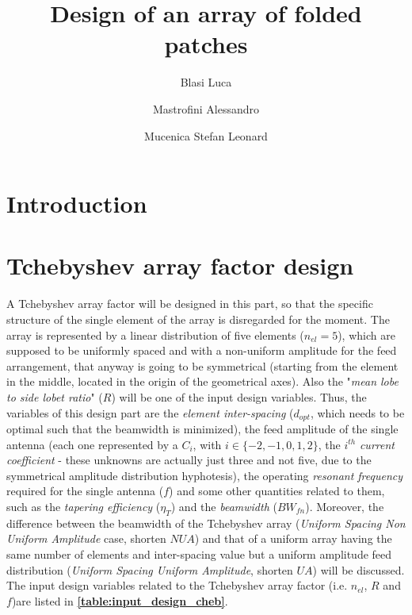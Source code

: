 \documentclass[10pt,a4paper,twocolumn]{article}
\title{\vspace*{20 pt}\fontfamily{qag}\selectfont\color{Turquoise}\huge\textbf{Design of an array of folded patches}\vspace*{10 pt}}
\author[1]{Blasi Luca}
\author[2]{Mastrofini Alessandro}
\author[3]{Mucenica Stefan Leonard}
\affil[2]{email}
\affil[3]{email}
\date{}
\begin{document}
	{\selectfont







\twocolumn[{
\begin{@twocolumnfalse} 
		\vspace*{10 pt}
	\begingroup
	\let\center\flushleft
	\maketitle

	\let\endcenter\endflushleft
	
	\endgroup
		\vspace*{5 pt}
		
		
	\begin{abstract}
	\textcolor{blue}{\lipsum[1-2]}
	\end{abstract}
	\vspace*{20 pt}
\end{@twocolumnfalse}
}
]




\section*{Introduction}
	\textcolor{blue}{\lipsum[1]}
\section*{Tchebyshev array factor design}

\indent A Tchebyshev array factor will be designed in this part, so that the specific structure of the single element of the array is disregarded for the moment. The array is represented by a linear distribution of five elements ($n_{el}=5$), which are supposed to be uniformly spaced and with a non-uniform amplitude for the feed arrangement, that anyway is going to be symmetrical (starting from the element in the middle, located in the origin of the geometrical axes). Also the "\emph{mean lobe to side lobet ratio}" ($R$) will be one of the input design variables. Thus, the variables of this design part are the \emph{element inter-spacing} ($d_{opt}$, which needs to be optimal such that the beamwidth is minimized), the feed amplitude of the single antenna (each one represented by a $C_i$, with $i\in\{-2,-1,0,1,2\}$, the $i^{th}$ \emph{current coefficient} - these unknowns are actually just three and not five, due to the symmetrical amplitude distribution hyphotesis), the operating \emph{resonant frequency} required for the single antenna ($f$) and some other quantities related to them, such as the \emph{tapering efficiency} ($\eta_T$) and the \emph{beamwidth} ($BW_{fn}$). Moreover, the difference between the beamwidth of the Tchebyshev array (\emph{Uniform Spacing Non Uniform Amplitude} case, shorten $NUA$) and  that of a uniform array having the same number of elements and inter-spacing value but a uniform amplitude feed distribution  (\emph{Uniform Spacing Uniform Amplitude}, shorten $UA$) will be discussed. The input design variables related to the Tchebyshev array factor (i.e. $n_{el}$, $R$ and $f$)are listed in \textbf{\cref{table:input_design_cheb}}. 

}
\end{document}
